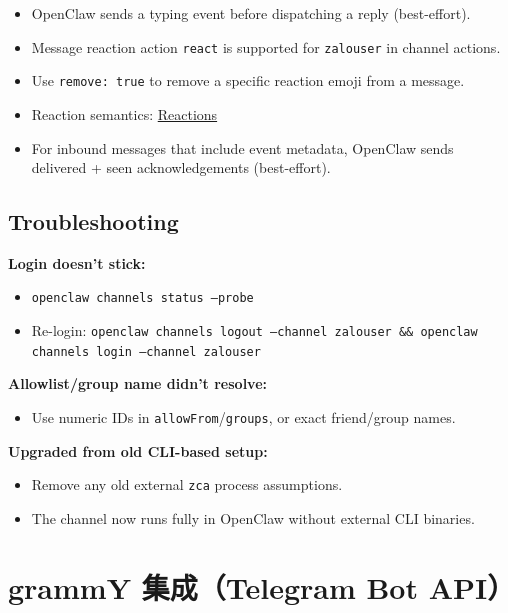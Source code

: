 \begin{itemize}
  \item OpenClaw sends a typing event before dispatching a reply (best-effort).
  \item Message reaction action \texttt{react} is supported for \texttt{zalouser} in channel actions.
  \item Use \texttt{remove: true} to remove a specific reaction emoji from a message.
  \item Reaction semantics: \href{/tools/reactions}{Reactions}
  \item For inbound messages that include event metadata, OpenClaw sends delivered + seen acknowledgements (best-effort).
\end{itemize}


\subsection{Troubleshooting}


\textbf{Login doesn't stick:}

\begin{itemize}
  \item \texttt{openclaw channels status --probe}
  \item Re-login: \texttt{openclaw channels logout --channel zalouser \&\& openclaw channels login --channel zalouser}
\end{itemize}


\textbf{Allowlist/group name didn't resolve:}

\begin{itemize}
  \item Use numeric IDs in \texttt{allowFrom}/\texttt{groups}, or exact friend/group names.
\end{itemize}


\textbf{Upgraded from old CLI-based setup:}

\begin{itemize}
  \item Remove any old external \texttt{zca} process assumptions.
  \item The channel now runs fully in OpenClaw without external CLI binaries.
\end{itemize}



\clearpage
\section{grammY 集成（Telegram Bot API）}


